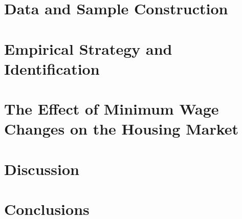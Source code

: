\documentclass{article}
\begin{document}
\section{Data and Sample Construction}\label{sec:data}
	

\section{Empirical Strategy and Identification}\label{sec:empirical_strategy}
    

\section{The Effect of Minimum Wage Changes on the Housing Market}\label{sec:results}
    

\section{Discussion}\label{sec:discussion}
	

\section{Conclusions}\label{sec:conclusion}
    



\clearpage
\printbibliography

\clearpage

\clearpage



\clearpage

\section*{}
\vspace{5mm}

\appendix

\renewcommand\thetable{\thesection.\arabic{table}}    
\renewcommand\thefigure{\thesection.\arabic{figure}} 
\setcounter{table}{0}
\setcounter{figure}{0}


\end{document}
